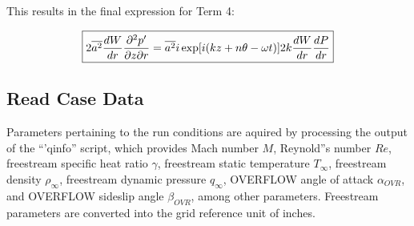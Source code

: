 \documentclass[]{aiaa-tc}%
\begin{document}
This results in the final expression for Term 4:

\begin{equation}
\boxed{2\overline{a^2} \dfrac{dW}{dr}\dfrac{\partial^2p'}{\partial z\partial r}
  = \overline{a^2} i\exp[i(kz + n\theta -\omega t)]
    2k \dfrac{dW}{dr} \dfrac{dP}{dr} } \\
\end{equation}





















\clearpage

\subsection{Read Case Data}

Parameters pertaining to the run conditions are aquired by processing the output of the ``'qinfo'' script, which provides Mach number $M$, Reynold''s number $Re$, freestream specific heat ratio $\gamma$, freestream static temperature $T_{\infty}$, freestream density $\rho_{\infty}$, freestream dynamic pressure $q_{\infty}$, OVERFLOW angle of attack $\alpha_{OVR}$, and OVERFLOW sideslip angle $\beta_{OVR}$, among other parameters.  Freestream parameters are converted into the grid reference unit of inches.
\end{document}
